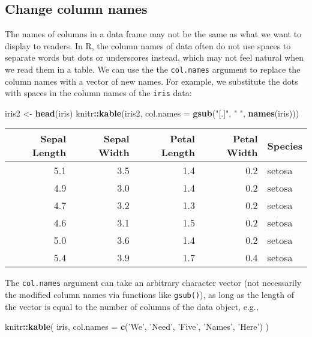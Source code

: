\documentclass[
  11pt,
]{krantz}
\newenvironment{Shaded}{\begin{snugshade}}{\end{snugshade}}
\newcommand{\DataTypeTok}[1]{\textcolor[rgb]{0.27,0.27,0.27}{#1}}
\newcommand{\KeywordTok}[1]{\textcolor[rgb]{0.27,0.27,0.27}{\textbf{#1}}}
\newcommand{\NormalTok}[1]{#1}
\newcommand{\OperatorTok}[1]{\textcolor[rgb]{0.43,0.43,0.43}{\textbf{#1}}}
\newcommand{\StringTok}[1]{\textcolor[rgb]{0.5,0.5,0.5}{#1}}
\begin{document}
\hypertarget{change-column-names}{%
\subsection{Change column names}\label{change-column-names}}

The names of columns in a data frame may not be the same as what we want to display to readers. In R, the column names of data often do not use spaces to separate words but dots or underscores instead, which may not feel natural when we read them in a table. We can use the the \texttt{col.names} argument to replace the column names with a vector of new names. For example, we substitute the dots with spaces in the column names of the \texttt{iris} data:

\begin{Shaded}
\begin{Highlighting}[]
\NormalTok{iris2 <-}\StringTok{ }\KeywordTok{head}\NormalTok{(iris)}
\NormalTok{knitr}\OperatorTok{::}\KeywordTok{kable}\NormalTok{(iris2, }\DataTypeTok{col.names =} \KeywordTok{gsub}\NormalTok{(}\StringTok{"[.]"}\NormalTok{, }\StringTok{" "}\NormalTok{, }\KeywordTok{names}\NormalTok{(iris)))}
\end{Highlighting}
\end{Shaded}

\begin{tabular}{r|r|r|r|l}
\hline
Sepal Length & Sepal Width & Petal Length & Petal Width & Species\\
\hline
5.1 & 3.5 & 1.4 & 0.2 & setosa\\
\hline
4.9 & 3.0 & 1.4 & 0.2 & setosa\\
\hline
4.7 & 3.2 & 1.3 & 0.2 & setosa\\
\hline
4.6 & 3.1 & 1.5 & 0.2 & setosa\\
\hline
5.0 & 3.6 & 1.4 & 0.2 & setosa\\
\hline
5.4 & 3.9 & 1.7 & 0.4 & setosa\\
\hline
\end{tabular}

The \texttt{col.names} argument can take an arbitrary character vector (not necessarily the modified column names via functions like \texttt{gsub()}), as long as the length of the vector is equal to the number of columns of the data object, e.g.,

\begin{Shaded}
\begin{Highlighting}[]
\NormalTok{knitr}\OperatorTok{::}\KeywordTok{kable}\NormalTok{(}
\NormalTok{  iris,}
  \DataTypeTok{col.names =} \KeywordTok{c}\NormalTok{(}\StringTok{'We'}\NormalTok{, }\StringTok{'Need'}\NormalTok{, }\StringTok{'Five'}\NormalTok{, }\StringTok{'Names'}\NormalTok{, }\StringTok{'Here'}\NormalTok{)}
\NormalTok{)}
\end{Highlighting}
\end{Shaded}
\end{document}
